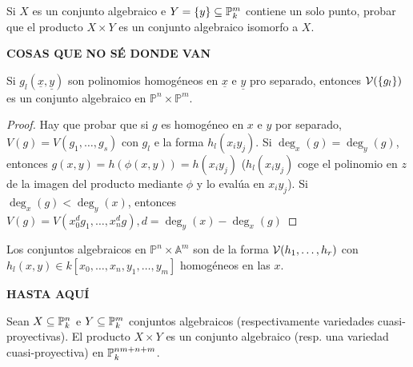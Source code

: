 \documentclass[ACGA.tex]{subfiles}
\begin{document}
\begin{ejer}\label{productoporpunto}
 Si $X$ es un conjunto algebraico e $Y=\{y\}\subseteq\mathbb{P}^m_k$ contiene un solo punto, probar que el producto $X\times Y$ es un conjunto algebraico isomorfo a $X$.
\end{ejer}
{\large\bf COSAS QUE NO SÉ DONDE VAN}
\begin{prop}
Si $g_l(\underline{x},\underline{y})$ son polinomios homogéneos en $\underline{x}$ e $\underline{y}$ pro separado, entonces $\mathcal{V}(\{g_l\})$ es un conjunto algebraico en $\mathbb{P}^n\times\mathbb{P}^m$. 
\end{prop}
\begin{proof}
Hay que probar que si $g$ es homogéneo en $x$ e $y$ por separado, $V(g)=V(g_1,\dots,g_s)$ con $g_l$ e la forma $h_l(x_iy_j)$. Si $\deg_x(g)=\deg_y(g)$, entonces $g(x,y)=h(\phi(x,y))=h(x_iy_j)$ ($h_l(x_iy_j)$ coge el polinomio en $z$ de la imagen del producto mediante $\phi$ y lo evalúa en $x_iy_j$). Si $\deg_x(g)<\deg_y(x)$, entonces $V(g)=V(x_0^dg_1,\dots, x_n^dg), d=\deg_y(x)-\deg_x(g)$
\end{proof}

Los conjuntos algebraicos en $\mathbb{P}^n\times\mathbb{A}^m$ son de la forma $\mathcal{V}(h_1,\dots,h_r)$ con $h_l(x,y)\in k[x_0,\dots, x_n,y_1,\dots, y_m]$ homogéneos en las $x$. 

{\large\bf HASTA AQUÍ}

\begin{prop}\label{productoirreducible}
 Sean $X\subseteq\mathbb{P}^n_k$ e $Y\subseteq\mathbb{P}^m_k$ conjuntos algebraicos (respectivamente variedades cuasi-proyectivas). El producto $X\times Y$ es un conjunto algebraico (resp. una variedad cuasi-proyectiva) en $\mathbb{P}^{nm+n+m}_k$.
\end{prop}
\end{document}
